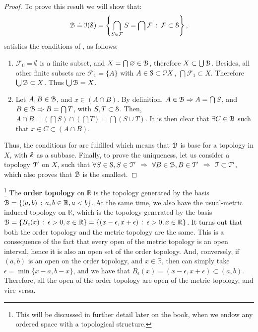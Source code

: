 \begin{proof}
	To prove this result we will show that:
	\[
	\B\doteq \I(\S)=\left\{\bigcap\limits_{S\in\mathcal{F}} S=\bigcap\mathcal{F}\,:\,\mathcal{F}\subset \S\right\},
	\]
	satisfies the conditions of , as follows:
	\begin{enumerate}
		\item $\mathcal{F}_{0}=\emptyset$ is a finite subset, and $X=\bigcap \emptyset\in\B$, therefore $X\subset
		\bigcup\B$.
		Besides, all other finite subsets are $\mathcal{F}_{1}=\{A\}$ with $A\in\S
		\subset\P X$, $\bigcap\mathcal{F}_{1}\subset X$.
		Therefore $\bigcup \B\subset X$.
		Thus $\bigcup\B = X$.
		\item Let $A, B\in \B$, and $x\in (A\cap B)$.
		By definition, $A\in\B \Rightarrow A=\bigcap S$,
		and $B\in \B \Rightarrow B =\bigcap T$, with $S, T\subset \S$.
		Then, $A\cap B = \left(\bigcap S\right)\cap\left(\bigcap T\right)=\bigcap (S\cup T)$.
		It is then clear that $\exists C\in\B$ such that $x\in C\subset (A\cap B)$.
	\end{enumerate}
	Thus, the conditions for  are fulfilled which means that
	$\B$ is base for a topology in $X$, with $\S$ as a subbase.
	Finally, to prove the uniqueness, let us consider a topology $\T'$ on $X$, 
	such that $\forall S\in \S, S\in \T'$ $\Rightarrow$ $\forall B\in\B, B\in\T'$ 
	$\Rightarrow$ $\T\subset \T'$, which also proves that $\B$ is the smallest.
\end{proof}

\begin{example}
	\footnote{This will be discussed in further detail later on the book, when
	we endow any ordered space with a topological structure.}
	The \textbf{order topology} on $\mathbb{R}$ is the topology generated by the
	basis $\B=\setdef{(a,b)}{a,b\in\mathbb{R}, a<b}$. At the same time, we also have
	the usual-metric induced topology on $\mathbb{R}$, which is the topology
	generated by the basis $\B=\setdef{B_\epsilon(x)}{\epsilon>0, x\in\mathbb{R}} = \setdef{(x-\epsilon, x+\epsilon)}{\epsilon>0, x\in\mathbb{R}}$.
	It turns out that both the order topology and the metric topology are the same.
	This is a consequence of the fact that every open of the metric topology is an
	open interval, hence it is also an open set of the order topology. And, conversely,
	if $(a,b)$ is an open on the order topology, and $x\in\mathbb{R}$, then can simply
	take $\epsilon=\min\{x-a, b-x\}$, and we have that $B_\epsilon(x)=(x-\epsilon, x+\epsilon)\subset (a,b)$.
	Therefore, all the open of the order topology are open of the metric topology, and
	vice versa.
\end{example}

